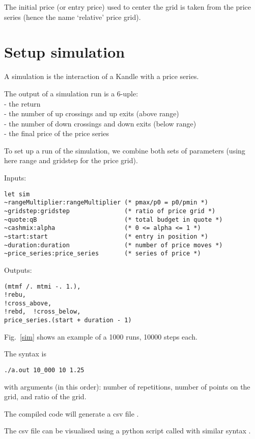 \documentclass[oneside]{article}
\begin{document}
The initial price (or entry price) 
used to center the grid is taken from the price series (hence the name `relative' price grid).

\section{Setup simulation}
A simulation is the interaction of a Kandle with a price series.

The output of a simulation run is a 6-uple:
\\- the return
\\- the number of up crossings and up exits (above range)
\\- the number of down crossings and down exits (below range)
\\- the final price of the price series

To set up a run of the simulation, 
we combine both sets of parameters (using here range and gridstep for the price grid).

Inputs:
\begin{verbatim}
let sim 
~rangeMultiplier:rangeMultiplier (* pmax/p0 = p0/pmin *)
~gridstep:gridstep               (* ratio of price grid *)
~quote:qB                        (* total budget in quote *)
~cashmix:alpha                   (* 0 <= alpha <= 1 *)
~start:start                     (* entry in position *)
~duration:duration               (* number of price moves *)
~price_series:price_series       (* series of price *)
\end{verbatim}

Outputs:
\begin{verbatim}
(mtmf /. mtmi -. 1.), 
!rebu, 
!cross_above, 
!rebd,  !cross_below, 
price_series.(start + duration - 1)
\end{verbatim}

Fig.~\ref{sim} shows an example of a 1000 runs, 10000 steps each. 

The syntax is
\begin{verbatim}
./a.out 10_000 10 1.25
\end{verbatim}
with arguments (in this order): number of repetitions, number of points on the grid, and ratio of the grid. 

The compiled code will generate a csv file . 

The csv file can be visualised using a python script called  with similar syntax .
\end{document}
